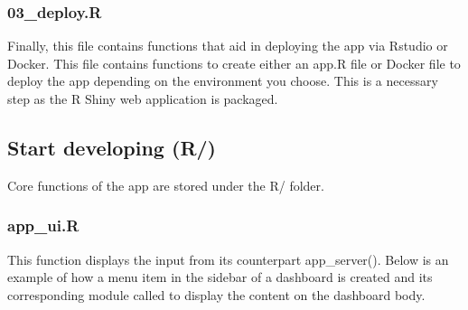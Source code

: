\documentclass[]{article}
\newenvironment{Shaded}{\begin{snugshade}}{\end{snugshade}}
\newcommand{\CommentTok}[1]{\textcolor[rgb]{0.56,0.35,0.01}{\textit{#1}}}
\newcommand{\ControlFlowTok}[1]{\textcolor[rgb]{0.13,0.29,0.53}{\textbf{#1}}}
\newcommand{\DataTypeTok}[1]{\textcolor[rgb]{0.13,0.29,0.53}{#1}}
\newcommand{\DecValTok}[1]{\textcolor[rgb]{0.00,0.00,0.81}{#1}}
\newcommand{\KeywordTok}[1]{\textcolor[rgb]{0.13,0.29,0.53}{\textbf{#1}}}
\newcommand{\NormalTok}[1]{#1}
\newcommand{\OperatorTok}[1]{\textcolor[rgb]{0.81,0.36,0.00}{\textbf{#1}}}
\newcommand{\StringTok}[1]{\textcolor[rgb]{0.31,0.60,0.02}{#1}}
\begin{document}
\hypertarget{deploy.r}{%
\subsubsection{03\_deploy.R}\label{deploy.r}}

Finally, this file contains functions that aid in deploying the app via
Rstudio or Docker. This file contains functions to create either an
app.R file or Docker file to deploy the app depending on the environment
you choose. This is a necessary step as the R Shiny web application is
packaged.

\hypertarget{start-developing-r}{%
\subsection{\texorpdfstring{\textbf{Start developing}
(R/)}{Start developing (R/)}}\label{start-developing-r}}

Core functions of the app are stored under the R/ folder.

\hypertarget{app_ui.r}{%
\subsubsection{app\_ui.R}\label{app_ui.r}}

This function displays the input from its counterpart app\_server().
Below is an example of how a menu item in the sidebar of a dashboard is
created and its corresponding module called to display the content on
the dashboard body.

\begin{Shaded}
\end{Shaded}
\end{document}
